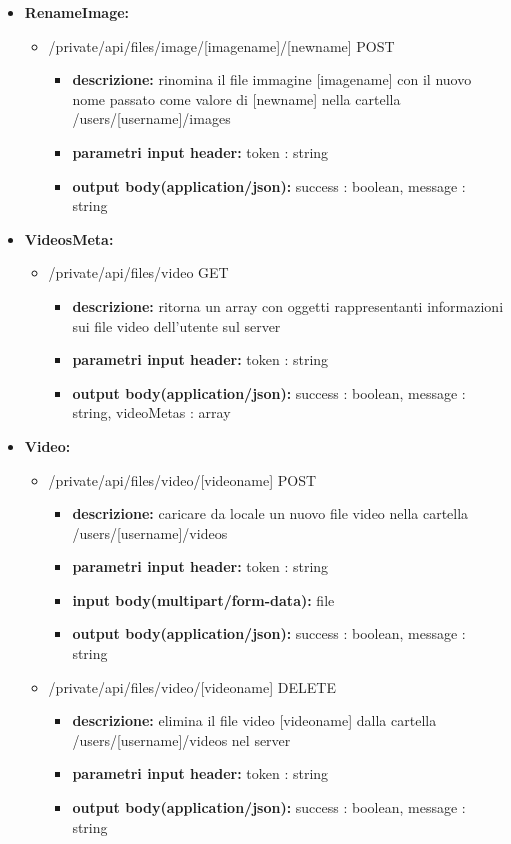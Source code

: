 {{\begin{itemize}
		\item \textbf{RenameImage:}
			\begin{itemize}
			\item   /private/api/files/image/[imagename]/[newname] POST
				\begin{itemize} 
				\item \textbf{descrizione:} rinomina il file immagine [imagename] con il nuovo nome passato come valore di [newname] nella cartella /users/[username]/images
				\item \textbf{parametri input header:} token : string
				\item \textbf{output body(application/json):}  success : boolean, message : string
				\end{itemize}
			\end{itemize}
			
		\item \textbf{VideosMeta:}
			\begin{itemize}
			\item   /private/api/files/video GET
				\begin{itemize} 
				\item \textbf{descrizione:} ritorna un array con oggetti rappresentanti informazioni sui file video dell'utente sul server
				\item \textbf{parametri input header:} token : string
				\item \textbf{output body(application/json):}  success : boolean, message : string, videoMetas : array
				\end{itemize}
			\end{itemize}
			
		\item \textbf{Video:}
			\begin{itemize}
			\item    /private/api/files/video/[videoname] POST
				\begin{itemize} 
				\item \textbf{descrizione:} caricare da locale un nuovo file video nella cartella /users/[username]/videos					
				\item \textbf{parametri input header:} token : string
				\item \textbf{input body(multipart/form-data):} file   
				\item \textbf{output body(application/json):}  success : boolean, message : string
				\end{itemize}
			\item    /private/api/files/video/[videoname] DELETE
				\begin{itemize} 
				\item \textbf{descrizione:} elimina il file video [videoname] dalla cartella /users/[username]/videos nel server				
				\item \textbf{parametri input header:} token : string
				\item \textbf{output body(application/json):}  success : boolean, message : string
				\end{itemize}
			\end{itemize}
			

\end{itemize}}}
